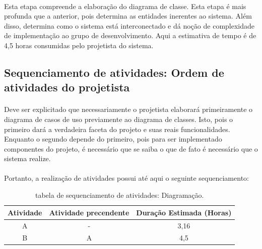\documentclass[12pt,a4paper]{article}
\begin{document}
		\paragraph{}Esta etapa compreende a elaboração do diagrama de classe. Esta etapa é mais profunda que a anterior, pois determina as entidades inerentes ao sistema. Além disso, determina como o sistema está interconectado e dá noção de complexidade de implementação ao grupo de desenvolvimento. Aqui a estimativa de tempo é de 4,5 horas consumidas pelo projetista do sistema.
		\subsection{Sequenciamento de atividades: Ordem de atividades do projetista}
		\paragraph{} Deve ser explicitado que necessariamente o projetista elaborará primeiramente o diagrama de casos de uso previamente ao diagrama de classes. Isto, pois o primeiro dará a verdadeira faceta do projeto e suas reais funcionalidades. Enquanto o segundo depende do primeiro, pois para ser implementado componentes do projeto, é necessário que se saiba o que de fato é necessário que o sistema realize.
		\paragraph{} Portanto, a realização de atividades possui até aqui o seguinte sequenciamento: \\
		\begin{table}[!ht]	
		\centering
		\begin{tabular}{|c|c|c|}
		\hline 
		Atividade & Atividade precendente & Duração Estimada (Horas) \\ 
		\hline 
		A & - & 3,16 \\ 
		\hline 
		B & A & 4,5 \\ 
		\hline 
		\end{tabular}
		\caption{tabela de sequenciamento de atividades: Diagramação.} 
		\end{table}
\end{document}
